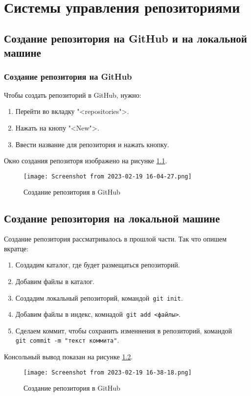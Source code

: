\graphicspath{{~/Documents/SftAppDvTech/FirstTask/RMS}}
\chapter{Системы управления репозиториями}

\section{Создание репозитория на GitHub и на локальной машине}
\subsection{Создание репозитория на GitHub}
Чтобы создать репозиторий в GitHub, нужно:
\begin{enumerate}
	\item Перейти во вкладку "<repositories">.
	\item Нажать на кнопу "<New">.
	\item Ввести название для репозитория и нажать кнопку.
\end{enumerate}
Окно создания репозиторя изображено на рисунке \ref{2:fig:GitHub:create_repo}.
\begin{figure}[h!tp]
	\centering
	\texttt{[image: Screenshot from 2023-02-19 16-04-27.png]}
	\caption{Создание репозитория в GitHub}
	\label{2:fig:GitHub:create_repo}
\end{figure}

\section{Создание репозитория на локальной машине}
Создание репозитория рассматривалось в прошлой части. Так что опишем вкратце:
\begin{enumerate}
	\item Создадим каталог, где будет размещаться репозиторий.
	\item Добавим файлы в каталог.
	\item Создадим локальный репозиторий, командой~\texttt{git~init}.
	\item Добавим файлы в индекс, комнадой~\texttt{git~add~<файлы>}.
	\item Сделаем коммит, чтобы сохранить изменнения в репозиторий,
		командой \texttt{git~commit~-m~"текст~коммита"}.
\end{enumerate}
Консольный вывод показан на рисунке \ref{2:fig:git:init}.
\begin{figure}[h!tp]
	\centering
	\texttt{[image: Screenshot from 2023-02-19 16-38-18.png]}
	\caption{Создание репозитория в GitHub}
	\label{2:fig:git:init}
\end{figure}

